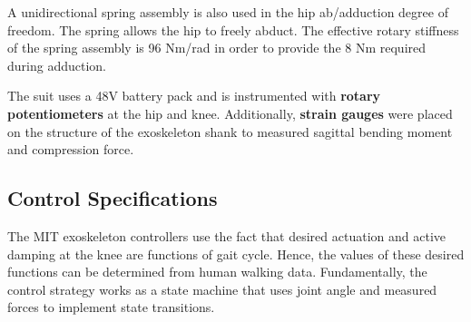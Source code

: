\begin{refsection}
 A unidirectional spring assembly is also used in the hip ab/adduction degree of freedom.  The spring allows the hip to freely abduct.  The effective rotary stiffness of the spring assembly is 96 Nm/rad in order to provide the 8 Nm required during adduction.

The suit uses a 48V battery pack and is instrumented with \textbf{rotary potentiometers} at the hip and knee.  Additionally, \textbf{strain gauges} were placed on the structure of the exoskeleton shank to measured sagittal bending moment and compression force.
 
 
 \subsection{Control Specifications}
 
The MIT exoskeleton controllers use the fact that desired actuation and active damping at the knee are functions of gait cycle.  Hence, the values of these desired functions can be determined from human walking data.  Fundamentally, the control strategy works as a state machine that uses joint angle and measured forces to implement state transitions.


\end{refsection}
